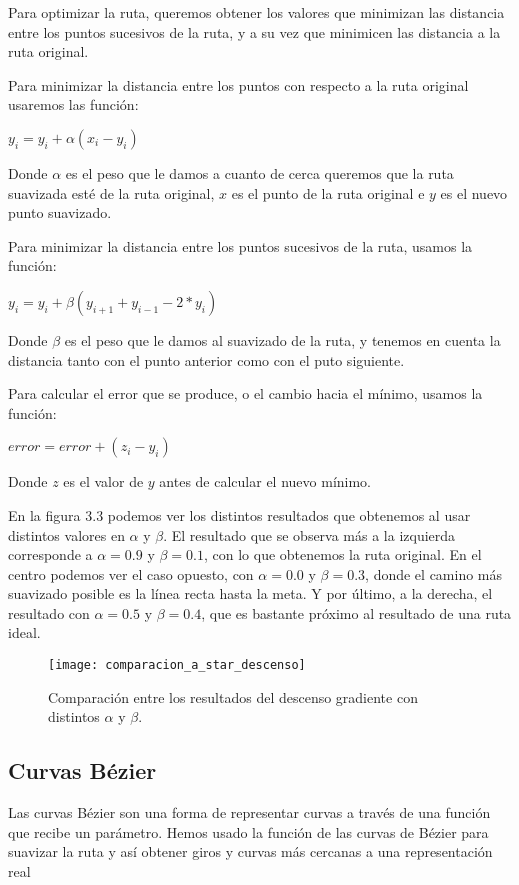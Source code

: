 Para optimizar la ruta, queremos obtener los valores que minimizan las distancia entre los puntos sucesivos de la ruta, y a su vez que minimicen las distancia a la ruta original.

Para minimizar la distancia entre los puntos con respecto a la ruta original usaremos las función:
\begin{center}
$y_i = y_i + \alpha (x_i - y_i)$
\end{center}
Donde $\alpha$ es el peso que le damos a cuanto de cerca queremos que la ruta suavizada esté de la ruta original, $x$ es el punto de la ruta original e $y$ es el nuevo punto suavizado.

Para minimizar la distancia entre los puntos sucesivos de la ruta, usamos la función:
\begin{center}
$y_i = y_i + \beta (y_{i+1} + y_{i-1} - 2 * y_i)$
\end{center}
Donde $\beta$ es el peso que le damos al suavizado de la ruta, y tenemos en cuenta la distancia tanto con el punto anterior como con el puto siguiente.

Para calcular el error que se produce, o el cambio hacia el mínimo, usamos la función:
\begin{center}
$error = error + (z_i - y_i)$
\end{center}
Donde $z$ es el valor de $y$ antes de calcular el nuevo mínimo.

En la figura 3.3 podemos ver los distintos resultados que obtenemos al usar distintos valores en $\alpha$ y $\beta$. El resultado que se observa más a la izquierda corresponde a $\alpha = 0.9$ y $\beta = 0.1$, con lo que obtenemos la ruta original. En el centro podemos ver el caso opuesto, con $\alpha = 0.0$ y $\beta = 0.3$, donde el camino más suavizado posible es la línea recta hasta la meta. Y por último, a la derecha, el resultado con $\alpha = 0.5$ y $\beta = 0.4$, que es bastante próximo al resultado de una ruta ideal.
\begin{figure}[!htpb]
    \centering
    \texttt{[image: comparacion\_a\_star\_descenso]}
    \caption[Efecto de $\alpha$ y $\beta$ en el descenso gradiente]{Comparación entre los resultados del descenso gradiente con distintos $\alpha$ y $\beta$.}
    \label{fig:basics AFM sketch}
\end{figure}

\subsection{Curvas Bézier}
Las curvas Bézier \cite{bezierdevmag, wiki:bezier} son una forma de representar curvas a través de una función que recibe un parámetro. Hemos usado la función de las curvas de Bézier para suavizar la ruta y así obtener giros y curvas más cercanas a una representación real

